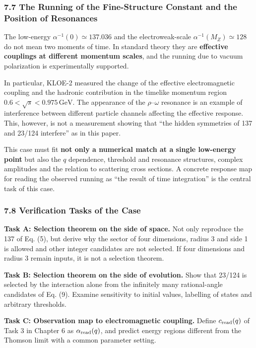 \documentclass[
  a4paper,
]{article}
\begin{document}
\subsubsection{7.7 The Running of the Fine-Structure Constant and the
Position of
Resonances}\label{the-running-of-the-fine-structure-constant-and-the-position-of-resonances}

The low-energy \(\alpha^{-1}(0)\simeq137.036\) and the electroweak-scale
\(\alpha^{-1}(M_Z)\simeq128\) do not mean two moments of time. In
standard theory they are \textbf{effective couplings at different
momentum scales}, and the running due to vacuum polarization is
experimentally supported.

In particular, KLOE-2 measured the change of the effective
electromagnetic coupling and the hadronic contribution in the timelike
momentum region \(0.6<\sqrt s<0.975\,\mathrm{GeV}\). The appearance of
the \(\rho\)--\(\omega\) resonance is an example of interference between
different particle channels affecting the effective response. This,
however, is not a measurement showing that ``the hidden symmetries of
137 and 23/124 interfere'' as in this paper.

This case must fit \textbf{not only a numerical match at a single
low-energy point} but also the \(q\) dependence, threshold and resonance
structures, complex amplitudes and the relation to scattering cross
sections. A concrete response map for reading the observed running as
``the result of time integration'' is the central task of this case.

\subsubsection{7.8 Verification Tasks of the
Case}\label{verification-tasks-of-the-case}

\textbf{Task A: Selection theorem on the side of space.} Not only
reproduce the 137 of Eq. (5), but derive why the sector of four
dimensions, radius 3 and side 1 is allowed and other integer candidates
are not selected. If four dimensions and radius 3 remain inputs, it is
not a selection theorem.

\textbf{Task B: Selection theorem on the side of evolution.} Show that
23/124 is selected by the interaction alone from the infinitely many
rational-angle candidates of Eq. (9). Examine sensitivity to initial
values, labelling of states and arbitrary thresholds.

\textbf{Task C: Observation map to electromagnetic coupling.} Define
\(c_{\rm read}(q)\) of Task 3 in Chapter 6 as \(\alpha_{\rm read}(q)\),
and predict energy regions different from the Thomson limit with a
common parameter setting.
\end{document}
